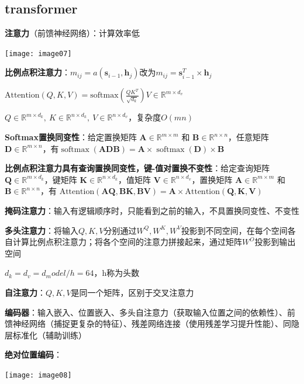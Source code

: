 	\subsection*{transformer}
	
	\textbf{注意力}（前馈神经网络）：计算效率低
	
	\begin{figurehere}
		\centering
		\texttt{[image: image07]}
		\label{fig:image07}
	\end{figurehere}
	\textbf{比例点积注意力}：$m_{ij}=a(\mathbf{s}_{i-1},\mathbf{h}_j)$改为$m_{ij}=\mathbf{s}_{i-1}^T\times \mathbf{h}_j$
	
	$\text{Attention}(Q,K,V) = \text{softmax}\left(\frac{QK^T}{\sqrt{d_k}} \right) V \in \mathbb{R}^{m \times d_v}$
	
	$Q \in \mathbb{R}^{m \times d_k},~K \in \mathbb{R}^{n \times d_k},~V \in \mathbb{R}^{n \times d_v}$，复杂度$O(mn)$
	
	\textbf{Softmax置换同变性}：给定置换矩阵 $\mathbf{A} \in \mathbb{R}^{m\times m}$ 和 $\mathbf{B} \in \mathbb{R}^{n\times n}$，任意矩阵 $\mathbf{D} \in \mathbb{R}^{m\times n}$，有$
	\operatorname{softmax}(\mathbf{ADB}) = \mathbf{A} \times \operatorname{softmax}(\mathbf{D}) \times \mathbf{B}$
	
	\textbf{比例点积注意力具有查询置换同变性，键-值对置换不变性}：给定查询矩阵 $\mathbf{Q} \in \mathbb{R}^{m\times d_{k}}$，键矩阵 $\mathbf{K} \in \mathbb{R}^{n\times d_{k}}$，值矩阵 $\mathbf{V} \in \mathbb{R}^{n\times d_{v}}$，置换矩阵 $\mathbf{A} \in \mathbb{R}^{m\times m}$ 和 $\mathbf{B} \in \mathbb{R}^{n\times n}$，有	$	\text{Attention}(\mathbf{AQ}, \mathbf{BK}, \mathbf{BV}) = \mathbf{A} \times \text{Attention}(\mathbf{Q}, \mathbf{K}, \mathbf{V})$
	
	\textbf{掩码注意力}：输入有逻辑顺序时，只能看到之前的输入，不具置换同变性、不变性
	
	\textbf{多头注意力}：将输入$Q,K,V$分别通过$W^{Q},W^{K},W^{V}$投影到不同空间，在每个空间各自计算比例点积注意力；将各个空间的注意力拼接起来，通过矩阵$W^{O}$投影到输出空间
	
	$d_k=d_v=d_model/h=64$，h称为头数
	
	\textbf{自注意力}：$Q,K,V$是同一个矩阵，区别于交叉注意力
	
	\textbf{编码器}：输入嵌入、位置嵌入、多头自注意力（获取输入位置之间的依赖性）、前馈神经网络（捕捉更复杂的特征）、残差网络连接（使用残差学习提升性能）、同隐层标准化（辅助训练）
	
	\textbf{绝对位置编码}：
	
	\begin{figurehere}
		\centering
		\texttt{[image: image08]}
		\label{fig:image08}
	\end{figurehere}
	
